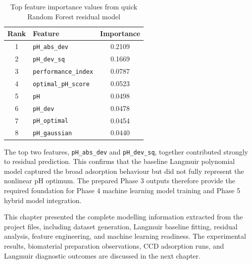\begin{table}[H]
	\centering
	\caption{Top feature importance values from quick Random Forest residual model}
	\label{tab:feature_importance}
	\renewcommand{\arraystretch}{1.2}
	\begin{tabular}{|c|l|c|}
		\hline
		\textbf{Rank} & \textbf{Feature} & \textbf{Importance} \\
		\hline
		1 & \texttt{pH\_abs\_dev} & 0.2109 \\
		\hline
		2 & \texttt{pH\_dev\_sq} & 0.1669 \\
		\hline
		3 & \texttt{performance\_index} & 0.0787 \\
		\hline
		4 & \texttt{optimal\_pH\_score} & 0.0523 \\
		\hline
		5 & \texttt{pH} & 0.0498 \\
		\hline
		6 & \texttt{pH\_dev} & 0.0478 \\
		\hline
		7 & \texttt{pH\_optimal} & 0.0454 \\
		\hline
		8 & \texttt{pH\_gaussian} & 0.0440 \\
		\hline
	\end{tabular}
\end{table}

The top two features, \texttt{pH\_abs\_dev} and \texttt{pH\_dev\_sq}, together contributed strongly to residual prediction. This confirms that the baseline Langmuir polynomial model captured the broad adsorption behaviour but did not fully represent the nonlinear pH optimum. The prepared Phase 3 outputs therefore provide the required foundation for Phase 4 machine learning model training and Phase 5 hybrid model integration.

This chapter presented the complete modelling information extracted from the project files, including dataset generation, Langmuir baseline fitting, residual analysis, feature engineering, and machine learning readiness. The experimental results, biomaterial preparation observations, CCD adsorption runs, and Langmuir diagnostic outcomes are discussed in the next chapter.
